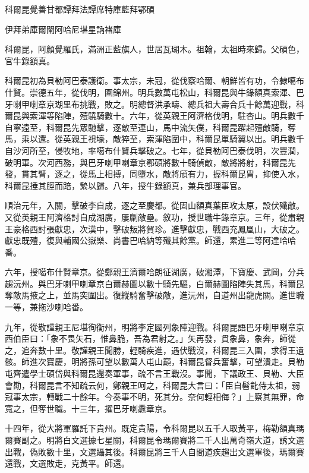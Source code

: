 
\begin{pinyinscope}
科爾昆覺善甘都譚拜法譚席特庫藍拜鄂碩

伊拜弟庫爾闡阿哈尼堪星訥褚庫

科爾昆，阿顏覺羅氏，滿洲正藍旗人，世居瓦瑚木。祖翰，太祖時來歸。父碩色，官牛錄額真。

科爾昆初為貝勒阿巴泰護衛。事太宗，未冠，從伐察哈爾、朝鮮皆有功，令隸噶布什賢。崇德五年，從伐明，圍錦州。明兵數萬屯松山，科爾昆與牛錄額真索渾、巴牙喇甲喇章京瑚里布挑戰，敗之。明總督洪承疇、總兵祖大壽合兵十餘萬迎戰，科爾昆與索渾等陷陣，殪驍騎數十。六年，從英親王阿濟格伐明，駐杏山。明兵數千自寧遠至，科爾昆先眾馳擊，逐敵至連山，馬中流矢僕，科爾昆躍起殪敵騎，奪馬，乘以還。從英親王視壕，敵猝至，索渾陷圍中，科爾昆單騎翼以出。明兵數千自沙河所至，侵牧地，率噶布什賢兵擊破之。七年，從貝勒阿巴泰伐明，次豐潤，破明軍。次河西務，與巴牙喇甲喇章京鄂碩將數十騎偵敵，敵將將射，科爾昆先發，貫其臂，逐之，從馬上相搏，同墮水，敵將頎有力，握科爾昆胄，抑使入水，科爾昆捶其脛而踣，縶以歸。八年，授牛錄額真，兼兵部理事官。

順治元年，入關，擊破李自成，逐之至慶都。從固山額真葉臣攻太原，設伏殲敵。又從英親王阿濟格討自成湖廣，屢劘敵壘。敘功，授世職牛錄章京。三年，從肅親王豪格西討張獻忠，次漢中，擊破叛將賀珍。進擊獻忠，戰西充鳳凰山，大破之。獻忠既殪，復與輔國公嶽樂、尚書巴哈納等殲其餘黨。師還，累進二等阿達哈哈番。

六年，授噶布什賢章京。從鄭親王濟爾哈朗征湖廣，破湘潭，下寶慶、武岡，分兵趨沅州。與巴牙喇甲喇章京白爾赫圖以數十騎先驅，白爾赫圖陷陣失其馬，科爾昆奪敵馬掖之上，並馬突圍出。復縱騎奮擊破敵，進沅州，自道州出龍虎關。進世職一等，兼拖沙喇哈番。

九年，從敬謹親王尼堪徇衡州，明將李定國列象陣迎戰。科爾昆語巴牙喇甲喇章京西伯臣曰：「象不畏矢石，惟鼻脆，吾為君射之。」矢再發，貫象鼻，象奔，師從之，追奔數十里。敬謹親王聞勝，輕騎疾進，遇伏戰沒，科爾昆三入圍，求得王遺骸。師進次寶慶，明將孫可望以數萬人屯山巔，科爾昆督兵奮擊，可望潰走。貝勒屯齊遣學士碩岱與科爾昆還奏軍事，疏不言王戰沒。事聞，下議政王、貝勒、大臣會勘，科爾昆言不知疏云何，鄭親王呵之，科爾昆大言曰：「臣自髫齔侍太祖，弱冠事太宗，轉戰二十餘年。今奏事不明，死其分。奈何輕相侮？」上察其無罪，命寬之，但奪世職。十三年，擢巴牙喇纛章京。

十四年，從大將軍羅託下貴州。既定貴陽，令科爾昆以五千人取黃平，梅勒額真瑪爾賽副之。明將白文選據七星關，科爾昆令瑪爾賽將二千人出萬奇嶺大道，誘文選出戰，偽敗數十里，文選躡其後。科爾昆將三千人自間道疾趨出文選軍後，瑪爾賽還戰，文選敗走，克黃平。師還。


\end{pinyinscope}
